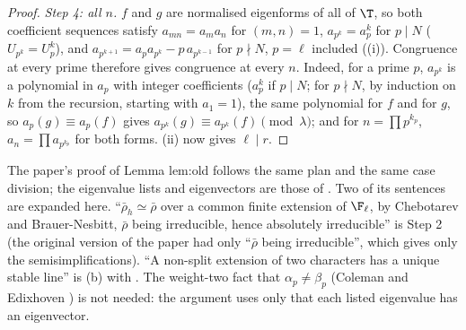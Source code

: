 \begin{proof}
\emph{Step 4: all $n$.} $f$ and $g$ are normalised eigenforms of all of $\T$, so both coefficient sequences satisfy $a_{mn}=a_ma_n$ for $(m,n)=1$, $a_{p^k}=a_p^k$ for $p\mid N$
($U_{p^k}=U_p^k$), and $a_{p^{k+1}}=a_pa_{p^k}-p\,a_{p^{k-1}}$ for $p\nmid N$, $p=\ell$ included ((i)). Congruence at every prime therefore gives
congruence at every $n$. Indeed, for a prime $p$, $a_{p^k}$ is a polynomial in $a_p$ with integer coefficients ($a_p^k$ if $p\mid N$; for $p\nmid N$, by induction on $k$ from the
recursion, starting with $a_1=1$), the same polynomial for $f$ and for $g$, so $a_p(g)\equiv a_p(f)$ gives $a_{p^k}(g)\equiv a_{p^k}(f)\pmod\lambda$; and for $n=\prod p^{k_p}$, $a_n=\prod a_{p^{k_p}}$
for both forms. (ii) now gives $\ell\mid r$.
\end{proof}

\begin{paperlink}
The paper's proof of Lemma lem:old follows the same plan and the same case division; the eigenvalue lists and eigenvectors are those of
. Two of its sentences are expanded here. ``$\bar\rho_h\simeq\bar\rho$ over a common finite extension of $\F_\ell$, by Chebotarev and
Brauer-Nesbitt, $\bar\rho$ being irreducible, hence absolutely irreducible'' is Step 2 (the original version of the paper had only ``$\bar\rho$ being irreducible'',
which gives only the semisimplifications). ``A non-split extension of two characters has a unique stable line'' is (b) with
. The weight-two fact that $\alpha_p\ne\beta_p$ (Coleman and Edixhoven \cite{ColemanEdixhoven}) is not needed: the argument uses only that each listed
eigenvalue has an eigenvector.
\end{paperlink}

